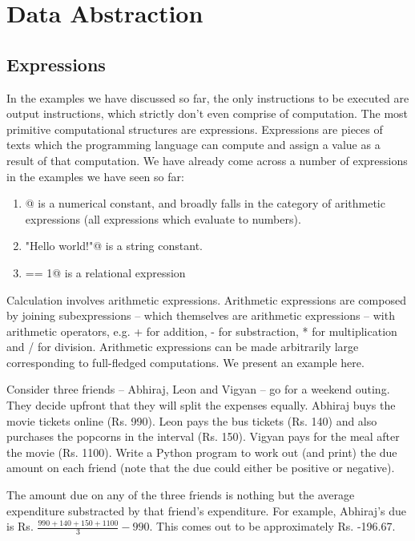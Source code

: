 \documentclass[12pt,a4paper]{article}
\begin{document}
\section{Data Abstraction}
\subsection{Expressions}
In the examples we have discussed so far, the only instructions to be executed are output instructions, which strictly don't even comprise of computation. The most primitive computational structures are expressions. Expressions are pieces of texts which the programming language can compute and assign a value as a result of that computation. We have already come across a number of expressions in the examples we have seen so far:
\begin{enumerate}
	\item {}@ is a numerical constant, and broadly falls in the category of arithmetic expressions (all expressions which evaluate to numbers).
	\item \lstinline@"Hello world!"@ is a string constant.
	\item {} == 1@ is a relational expression
\end{enumerate}

Calculation involves arithmetic expressions. Arithmetic expressions are composed by joining subexpressions -- which themselves are arithmetic expressions -- with arithmetic operators, e.g. + for addition, - for substraction, * for multiplication and / for division. Arithmetic expressions can be made arbitrarily large corresponding to full-fledged computations. We present an example here.

Consider three friends -- Abhiraj, Leon and Vigyan -- go for a weekend outing. They decide upfront that they will split the expenses equally. Abhiraj buys the movie tickets online (Rs. 990). Leon pays the bus tickets (Rs. 140) and also purchases the popcorns in the interval (Rs. 150). Vigyan pays for the meal after the movie (Rs. 1100). Write a Python program to work out (and print) the due amount on each friend (note that the due could either be positive or negative).

The amount due on any of the three friends is nothing but the average expenditure substracted by that friend's expenditure. For example, Abhiraj's due is Rs. $\frac{990 + 140 + 150 + 1100}{3} - 990$. This comes out to be approximately Rs. -196.67.  
\end{document}
